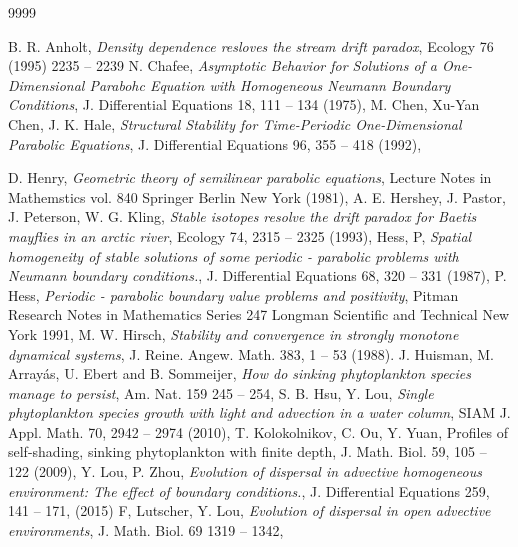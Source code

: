 	\begin{thebibliography}{9999}
		
		B. R. Anholt,
		\emph{Density dependence resloves the stream drift paradox},
		Ecology 76 (1995) 2235 -- 2239
		N. Chafee,
		\emph{Asymptotic Behavior for Solutions of a
			One-Dimensional Parabohc Equation with
			Homogeneous Neumann Boundary Conditions},
		J. Differential Equations 18, 111 -- 134 (1975),
		M. Chen, Xu-Yan Chen, J. K. Hale,
		\emph{Structural Stability for Time-Periodic
			One-Dimensional Parabolic Equations},
		J. Differential Equations 96, 355 -- 418 (1992),
		
		
		D. Henry,
		\emph{Geometric theory of semilinear parabolic equations},
		Lecture Notes in Mathemstics vol. 840 Springer Berlin New York (1981),
		A. E. Hershey, J. Pastor, J. Peterson, W. G. Kling,
		\emph{Stable isotopes resolve the drift paradox for Baetis mayflies in an arctic river},
		Ecology 74,  2315 -- 2325 (1993),
		Hess, P,
		\emph{Spatial homogeneity of stable solutions of some periodic - parabolic problems with Neumann boundary conditions.},
		J. Differential Equations 68,  320 -- 331 (1987), 
		P. Hess, 
		\emph{Periodic - parabolic  boundary value problems and positivity},
		Pitman Research Notes in Mathematics Series 247 Longman Scientific and Technical New York 1991,
		M. W. Hirsch,
		\emph{Stability and convergence in strongly monotone dynamical systems},
		J. Reine. Angew. Math. 383,  1 -- 53 (1988).
		J. Huisman, M. Array\'as, U. Ebert and B. Sommeijer,
		\emph{How do sinking phytoplankton species manage to persist},
		Am. Nat. 159 245 -- 254,
		S. B. Hsu, Y. Lou,
		\emph{Single phytoplankton species growth with light and advection in a water column},
		SIAM J. Appl. Math. 70,  2942 -- 2974 (2010),
		T. Kolokolnikov, C. Ou, Y. Yuan, Profiles of self-shading, sinking phytoplankton with finite depth, J. Math. Biol. 59, 
		105 -- 122 (2009),
		Y. Lou, P. Zhou,
		\emph{Evolution of dispersal in advective homogeneous environment: The effect of boundary conditions.},
		J. Differential Equations 259,  141 -- 171, (2015)
		F, Lutscher, Y. Lou,
		\emph{Evolution of dispersal in open advective environments},
		J. Math. Biol. 69 1319 -- 1342, 
		

\end{thebibliography}
